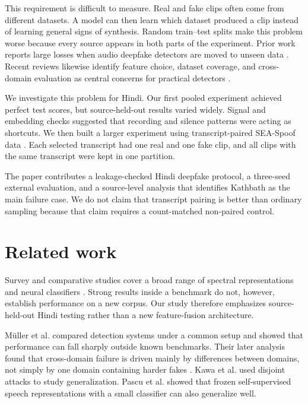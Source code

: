\documentclass[3p,times,procedia]{elsarticle}
\begin{document}
This requirement is difficult to measure. Real and fake clips often come
from different datasets. A model can then learn which dataset produced a
clip instead of learning general signs of synthesis. Random train--test
splits make this problem worse because every source appears in both parts of
the experiment. Prior work reports large losses when audio deepfake
detectors are moved to unseen data \cite{muller2022generalize,muller2024harder}.
Recent reviews likewise identify feature choice, dataset coverage, and
cross-domain evaluation as central concerns for practical detectors
\cite{salih2025review,zhang2025survey}.

We investigate this problem for Hindi. Our first pooled experiment achieved
perfect test scores, but source-held-out results varied widely. Signal and
embedding checks suggested that recording and silence patterns were acting
as shortcuts. We then built a larger experiment using transcript-paired
SEA-Spoof data \cite{wu2025seaspoof}. Each selected transcript had one real
and one fake clip, and all clips with the same transcript were kept in one
partition.

The paper contributes a leakage-checked Hindi deepfake protocol, a
three-seed external evaluation, and a source-level analysis that identifies
Kathbath as the main failure case. We do not claim that transcript pairing
is better than ordinary sampling because that claim requires a count-matched
non-paired control.

\section{Related work}
Survey and comparative studies cover a broad range of spectral
representations and neural classifiers
\cite{salih2025review,verma2025comparative,zhang2025survey}. Strong results
inside a benchmark do not, however, establish performance on a new corpus.
Our study therefore emphasizes source-held-out Hindi testing rather than a
new feature-fusion architecture.

M{\"u}ller et al. \cite{muller2022generalize} compared detection systems under
a common setup and showed that performance can fall sharply outside known
benchmarks. Their later analysis found that cross-domain failure is driven
mainly by differences between domains, not simply by one domain containing
harder fakes \cite{muller2024harder}. Kawa et al. \cite{kawa2022attack}
used disjoint attacks to study generalization. Pascu et al.
\cite{pascu2024calibrated} showed that frozen self-supervised speech
representations with a small classifier can also generalize well.
\end{document}
